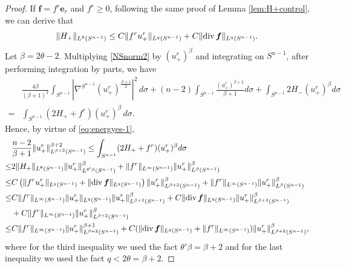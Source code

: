 \documentclass[12pt]{amsart}
\renewcommand{\div}{{\rm div \thinspace }}
\newcommand{\Be}{{\boldsymbol{e}}}
\newcommand{\Bf}{{\boldsymbol{f}}}
\begin{document}
\begin{proof}
	If $\Bf=f^r \Be_{r}$ and $f^r\geq 0$,  following the same proof of Lemma \ref{lem:H+control}, we can derive that    
	\begin{equation}\label{eq:energyes-1}
		\|H_+\|_{L^{\theta}(S^{n-1})}
		\leq C \|f^ru^r_+\|_{L^q(S^{n-1})}+C\|\div \Bf\|_{L^q(S^{n-1})} .
	\end{equation}  
	Let $\beta = 2\theta -2$. Multiplying \eqref{NSnorm2} by $(u^r_{+})^\beta$ and integrating on $S^{n-1}$, after performing integration by parts, we have 
	\begin{equation*}
		\begin{aligned}
			&  \frac{4\beta}{(\beta+1)^2} \int_{S^{n-1}} \left| \nabla^{S^{n-1}} (u_{+}^r)^{\frac{\beta +1}{2}}\right|^2 \, d\sigma + (n-2) \int_{S^{n-1}} \frac{(u^r_{+})^{\beta +2}}{\beta +1} d\sigma + \int_{S^{n-1}}2H_{-}(u_{+}^r)^\beta d\sigma \\
			=& \int_{S^{n-1}} (2 H_{+} + f^r ) (u^r_{+})^\beta \, d\sigma. 
		\end{aligned}
	\end{equation*}
	Hence,  by virtue of \eqref{eq:energyes-1}, 
	\begin{equation*}
		\begin{aligned}
			& \frac{n-2}{\beta+1} \|u^r_+\|_{L^{\beta+2}(S^{n-1})}^{\beta+2} 
			\leq  \int_{S^{n-1}} (2H_+ + f^r) (u^r_+)^{\beta} d\sigma  \\
			\leq &
			2\|H_+\|_{L^{\theta}(S^{n-1})}\|u^r_+\|_{L^{\theta'\beta}(S^{n-1})}^{\beta} + \|f^r\|_{L^{\infty}(S^{n-1})}\|u^r_+\|_{L^{\beta}(S^{n-1})}^{\beta} \\
			\leq & C\left(\|f^ru^r_+\|_{L^q(S^{n-1})}+\|\div \Bf\|_{L^q(S^{n-1})} \right
			)\|u^r_+\|_{L^{\beta +2 }(S^{n-1})}^{\beta} + \|f^r\|_{L^{\infty}(S^{n-1})}\|u^r_+\|_{L^{\beta}(S^{n-1})}^{\beta}\\
			\leq & C\|f^r\|_{L^{\infty}(S^{n-1})} \|u^r_+\|_{L^{q}(S^{n-1})}\|u^r_+\|_{L^{\beta+2}(S^{n-1})}^{\beta} +C \|\div \Bf\|_{L^q(S^{n-1})}
			\|u^r_+\|_{L^{\beta+2}(S^{n-1})}^{\beta}\\
			& + C\|f^r\|_{L^{\infty}(S^{n-1})}\|u^r_+\|_{L^{\beta+2}(S^{n-1})}^{\beta}\\
			\leq &  C\|f^r\|_{L^{\infty}(S^{n-1})} \|u^r_+\|_{L^{\beta+2}(S^{n-1})}^{\beta+1} + C(\|\div \Bf\|_{L^q(S^{n-1})}+\|f^r\|_{L^{\infty}(S^{n-1})})\|u^r_+\|_{L^{\beta+2}(S^{n-1})}^{\beta}, 
		\end{aligned}
	\end{equation*}
	where for the third inequality we used the fact $\theta' \beta = \beta +2$ and for the last inequality we used the fact $q<2\theta =\beta+2$. 

\end{proof}
\end{document}
